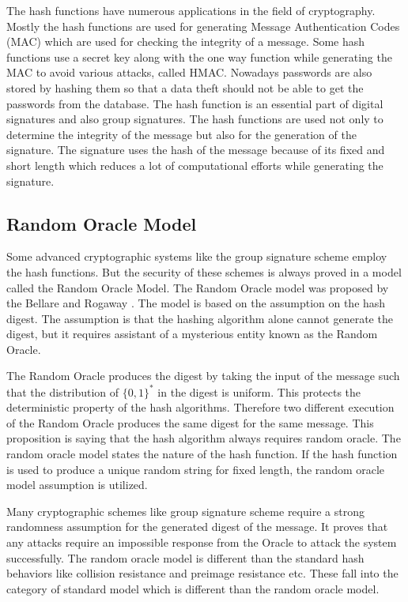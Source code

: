 The hash functions have numerous applications in the field of cryptography. Mostly the hash functions are used for generating Message Authentication Codes (MAC) which are used for checking the integrity of a message. Some hash functions use a secret key along with the one way function while generating the MAC to avoid various attacks, called HMAC. Nowadays passwords are also stored by hashing them so that a data theft should not be able to get the passwords from the database. The hash function is an essential part of digital signatures and also group signatures. The hash functions are used not only to determine the integrity of the message but also for the generation of the signature. The signature uses the hash of the message because of its fixed and short length which reduces a lot of computational efforts while generating the signature. 
\subsection{Random Oracle Model}\label{sub:random oracle model}
Some advanced cryptographic systems like the group signature scheme employ the hash functions. But the security of these schemes is always proved in a model called the Random Oracle Model. The Random Oracle model was proposed by the Bellare and Rogaway \cite{bellare1993random}. The model is based on the assumption on the hash digest. The assumption is that the hashing algorithm alone cannot generate the digest, but it requires assistant of a mysterious entity known as the Random Oracle. 

The Random Oracle produces the digest by taking the input of the message such that the distribution of $\{0, 1\}^*$ in the digest is uniform. This protects the deterministic property of the hash algorithms. Therefore two different execution of the Random Oracle produces the same digest for the same message. This proposition is saying that the hash algorithm always requires random oracle. The random oracle model states the nature of the hash function. If the hash function is used to produce a unique random string for fixed length, the random oracle model assumption is utilized. 

Many cryptographic schemes like group signature scheme require a strong randomness assumption for the generated digest of the message. It proves that any attacks require an impossible response from the Oracle to attack the system successfully. The random oracle model is different than the standard hash behaviors like collision resistance and preimage resistance etc. These fall into the category of standard model which is different than the random oracle model. 

